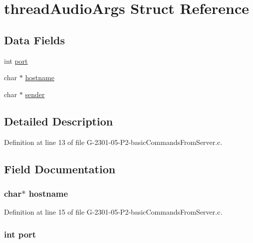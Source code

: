 \hypertarget{structthread_audio_args}{\section{thread\-Audio\-Args Struct Reference}
\label{structthread_audio_args}
}
\subsection*{Data Fields}
\begin{DoxyCompactItemize}
\item 
int \hyperlink{structthread_audio_args_a63c89c04d1feae07ca35558055155ffb}{port}
\item 
char $\ast$ \hyperlink{structthread_audio_args_af203df082d5c6dcaa0c88b07cf86466d}{hostname}
\item 
char $\ast$ \hyperlink{structthread_audio_args_ab092ba1f84e458809eb91a5786b281de}{sender}
\end{DoxyCompactItemize}


\subsection{Detailed Description}


Definition at line 13 of file G-\/2301-\/05-\/\-P2-\/basic\-Commands\-From\-Server.\-c.



\subsection{Field Documentation}
\hypertarget{structthread_audio_args_af203df082d5c6dcaa0c88b07cf86466d}{
\subsubsection[{hostname}]{\setlength{\rightskip}{0pt plus 5cm}char$\ast$ hostname}}\label{structthread_audio_args_af203df082d5c6dcaa0c88b07cf86466d}


Definition at line 15 of file G-\/2301-\/05-\/\-P2-\/basic\-Commands\-From\-Server.\-c.

\hypertarget{structthread_audio_args_a63c89c04d1feae07ca35558055155ffb}{
\subsubsection[{port}]{\setlength{\rightskip}{0pt plus 5cm}int port}}\label{structthread_audio_args_a63c89c04d1feae07ca35558055155ffb}


